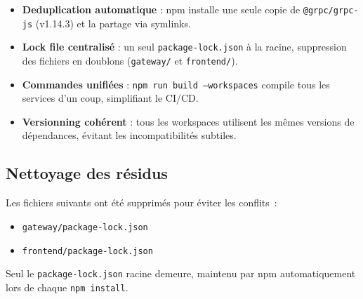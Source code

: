 \documentclass[12pt,a4paper]{article}
\begin{document}
\begin{itemize}[leftmargin=*]
  \item \textbf{Deduplication automatique} : npm installe une seule copie de
        \texttt{@grpc/grpc-js} (v1.14.3) et la partage via symlinks.
  \item \textbf{Lock file centralis\'{e}} : un seul \texttt{package-lock.json} \`{a}
        la racine, suppression des fichiers en doublons (\texttt{gateway/} et
        \texttt{frontend/}).
  \item \textbf{Commandes unifi\'{e}es} : \texttt{npm run build --workspaces} compile
        tous les services d'un coup, simplifiant le CI/CD.
  \item \textbf{Versionning coh\'{e}rent} : tous les workspaces utilisent les m\^{e}mes
        versions de d\'{e}pendances, \'{e}vitant les incompatibilit\'{e}s subtiles.
\end{itemize}

\subsection{Nettoyage des r\'{e}sidus}

Les fichiers suivants ont \'{e}t\'{e} supprim\'{e}s pour \'{e}viter les conflits~:
\begin{itemize}[leftmargin=*]
  \item \texttt{gateway/package-lock.json}
  \item \texttt{frontend/package-lock.json}
\end{itemize}

Seul le \texttt{package-lock.json} racine demeure, maintenu par npm
automatiquement lors de chaque \texttt{npm install}.
\end{document}
